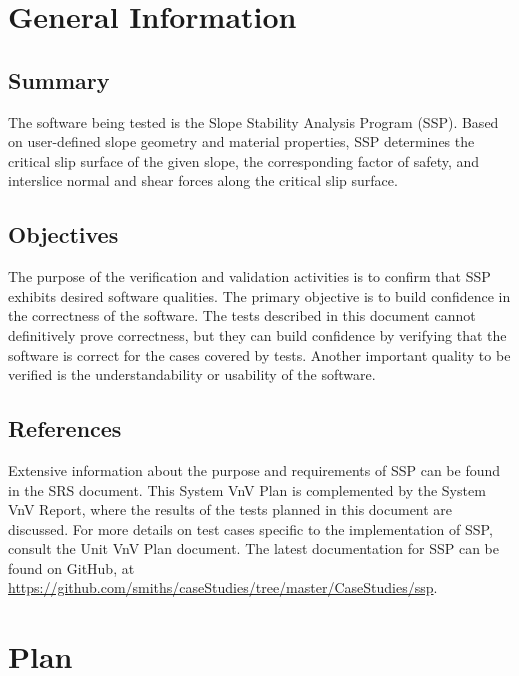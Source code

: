 \documentclass[12pt, titlepage]{article}
\begin{document}
\section{General Information} \label{sec_GenInfo}

\subsection{Summary}

\noindent The software being tested is the Slope Stability Analysis Program 
(SSP). Based on user-defined slope geometry and material properties, SSP 
determines the critical slip surface of the given slope, the corresponding 
factor of safety, and interslice normal and shear forces along the critical 
slip surface.

\subsection{Objectives}

\noindent The purpose of the verification and validation activities is to 
confirm that SSP exhibits desired software qualities. The primary objective is 
to build confidence in the correctness of the software. The tests described in 
this document cannot definitively prove correctness, but they can build 
confidence by verifying that the software is correct for the cases covered by 
tests. Another important quality to be verified is the understandability or 
usability of the software.

\subsection{References}

\noindent Extensive information about the purpose and requirements of SSP can 
be found in the SRS document. This System VnV Plan is complemented by the 
System VnV Report, where the results of the tests planned in this document are 
discussed. For more details on test cases specific to the implementation of 
SSP, consult the Unit VnV Plan document. The latest documentation for SSP can 
be found 
on GitHub, at \newline 
\href{https://github.com/smiths/caseStudies/tree/master/CaseStudies/ssp}{https://github.com/smiths/caseStudies/tree/master/CaseStudies/ssp}.

\section{Plan} \label{sec_Plan}
	
\end{document}
